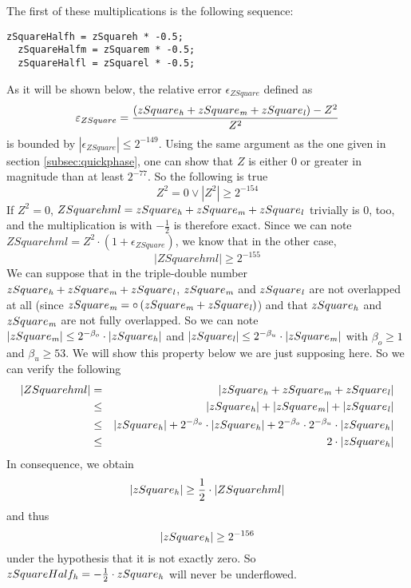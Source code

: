 The first of these multiplications is the following sequence:
\begin{lstlisting}[caption={Multiplication of triple-double $\circ\left( Z \cdot Z \right)$ by $-\frac{1}{2}$},firstnumber=99]
  zSquareHalfh = zSquareh * -0.5;
  zSquareHalfm = zSquarem * -0.5;
  zSquareHalfl = zSquarel * -0.5;
\end{lstlisting}
As it will be shown below, the relative error $\epsilon_{ZSquare}$ defined as
$$\varepsilon_{ZSquare} = \frac{\left( zSquare_{\mathit{h}} + zSquare_{\mathit{m}} + zSquare_{\mathit{l}} \right) - Z^2}{Z^2}$$
is bounded by $\left \vert \epsilon_{ZSquare} \right \vert \leq 2^{-149}$.
Using the same argument as the one given in section \ref{subsec:quickphase}, one can show that $Z$ is either $0$ 
or greater in magnitude than at least $2^{-77}$. So the following is true
$$Z^2 = 0 \lor \left \vert Z^2 \right \vert \geq 2^{-154}$$
If $Z^2=0$, $ZSquarehml = zSquare_{\mathit{h}} + zSquare_{\mathit{m}} + zSquare_{\mathit{l}}$ trivially is $0$, too, and the multiplication is 
with $-\frac{1}{2}$ is therefore exact. 
Since we can note $ZSquarehml = Z^2 \cdot \left( 1 + \epsilon_{ZSquare} \right)$, we know that in the other case, 
$$\left \vert ZSquarehml \right \vert \geq 2^{-155}$$
We can suppose that in the triple-double number $zSquare_{\mathit{h}} + zSquare_{\mathit{m}} + zSquare_{\mathit{l}}$, $zSquare_{\mathit{m}}$ and 
$zSquare_{\mathit{l}}$ are not overlapped at all (since $zSquare_{\mathit{m}} = \circ \left( zSquare_{\mathit{m}} + zSquare_{\mathit{l}} \right)$) 
and that $zSquare_{\mathit{h}}$ and $zSquare_{\mathit{m}}$ are not fully overlapped.
So we can note $\left \vert zSquare_{\mathit{m}} \right \vert \leq 2^{-\beta_o} \cdot \left \vert zSquare_{\mathit{h}} \right \vert$ and
$\left \vert zSquare_{\mathit{l}} \right \vert \leq 2^{-\beta_u} \cdot \left \vert zSquare_{\mathit{m}} \right \vert$ with $\beta_o \geq 1$ and 
$\beta_u \geq 53$.
We will show this property below we are just supposing here.
So we can verify the following
\begin{eqnarray*}
\left \vert ZSquarehml \right \vert & = & \left \vert zSquare_{\mathit{h}} + zSquare_{\mathit{m}} + zSquare_{\mathit{l}} \right \vert \\
& \leq & \left \vert zSquare_{\mathit{h}} \right \vert + \left \vert zSquare_{\mathit{m}} \right \vert + \left \vert zSquare_{\mathit{l}} \right \vert \\
& \leq & \left \vert zSquare_{\mathit{h}} \right \vert + 
2^{-\beta_o} \cdot \left \vert zSquare_{\mathit{h}} \right \vert + 
2^{-\beta_o} \cdot 2^{-\beta_u} \cdot \left \vert zSquare_{\mathit{h}} \right \vert \\
& \leq & 2 \cdot \left \vert zSquare_{\mathit{h}} \right \vert 
\end{eqnarray*}
In consequence, we obtain
$$\left \vert zSquare_{\mathit{h}} \right \vert \geq \frac{1}{2} \cdot \left \vert ZSquarehml \right \vert$$
and thus
$$\left \vert zSquare_{\mathit{h}} \right \vert \geq 2^{-156}$$ under the hypothesis that it is not exactly zero.
So $zSquareHalf_{\mathit{h}} = -\frac{1}{2} \cdot zSquare_{\mathit{h}}$ will never be underflowed.

